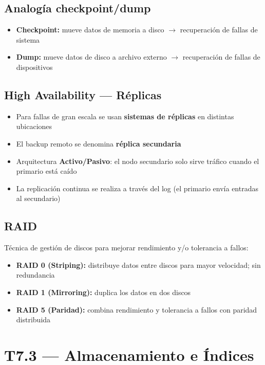 \documentclass[12pt, a4paper]{article}
\begin{document}
\subsection{Analogía checkpoint/dump}
\begin{itemize}
  \item \textbf{Checkpoint:} mueve datos de memoria a disco $\rightarrow$ recuperación de fallas de sistema
  \item \textbf{Dump:} mueve datos de disco a archivo externo $\rightarrow$ recuperación de fallas de dispositivos
\end{itemize}

\subsection{High Availability — Réplicas}
\begin{itemize}
  \item Para fallas de gran escala se usan \textbf{sistemas de réplicas} en distintas ubicaciones
  \item El backup remoto se denomina \textbf{réplica secundaria}
  \item Arquitectura \textbf{Activo/Pasivo}: el nodo secundario solo sirve tráfico cuando el primario está caído
  \item La replicación continua se realiza a través del log (el primario envía entradas al secundario)
\end{itemize}

\subsection{RAID}
Técnica de gestión de discos para mejorar rendimiento y/o tolerancia a fallos:
\begin{itemize}
  \item \textbf{RAID 0 (Striping):} distribuye datos entre discos para mayor velocidad; sin redundancia
  \item \textbf{RAID 1 (Mirroring):} duplica los datos en dos discos
  \item \textbf{RAID 5 (Paridad):} combina rendimiento y tolerancia a fallos con paridad distribuida
\end{itemize}

\section{T7.3 — Almacenamiento e Índices}
\end{document}
